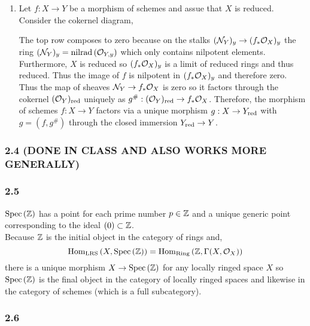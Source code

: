 \documentclass[12pt]{article}
\begin{document}
\begin{enumerate}
\item Let $f : X \to Y$ be a morphism of schemes and assue that $X$ is reduced. Consider the cokernel diagram,
\begin{center}
\end{center}
The top row composes to zero because on the stalks $(\mathcal{N}_Y)_y \to (f_* \mathcal{O}_{X})_y$ the ring $(\mathcal{N}_Y)_y = \mathrm{nilrad}\left( \mathcal{O}_{Y, y} \right)$ which only contains nilpotent elements. Furthermore, $X$ is reduced so $(f_* \mathcal{O}_{X})_y$ is a limit of reduced rings and thus reduced. Thus the image of $f$ is nilpotent in $(f_* \mathcal{O}_{X})_y$ and therefore zero. Thus the map of sheaves $\mathcal{N}_Y \to f_* \mathcal{O}_{X}$ is zero so it factors through the cokernel $(\mathcal{O}_{Y})_{\mathrm{red}}$ uniquely as $g^\# : (\mathcal{O}_{Y})_{\mathrm{red}} \to f_* \mathcal{O}_{X}$. Therefore, the morphism of schemes $f : X \to Y$ factors via a unique morphism $g : X \to Y_{\mathrm{red}}$ with $g = (f, g^\#)$ through the closed immersion $Y_{\mathrm{red}} \to Y$.
\end{enumerate}

\subsubsection{2.4 (DONE IN CLASS AND ALSO WORKS MORE GENERALLY)}

\subsubsection{2.5}

$\mathrm{Spec}\left( \mathbb{Z} \right)$ has a point for each prime number $p \in \mathbb{Z}$ and a unique generic point corresponding to the ideal $(0) \subset \mathbb{Z}$.
\bigskip\\
Because $\mathbb{Z}$ is the initial object in the category of rings and,
\[ \mathrm{Hom}_{\mathrm{LRS}} \left( X, \mathrm{Spec}\left( \mathbb{Z} \right) \right) = \mathrm{Hom}_{\mathrm{Ring}} \left( \mathbb{Z}, \Gamma(X, \mathcal{O}_{X}) \right) \]
there is a unique morphism $X \to \mathrm{Spec}\left( \mathbb{Z} \right)$ for any locally ringed space $X$ so $\mathrm{Spec}\left( \mathbb{Z} \right)$ is the final object in the category of locally ringed spaces and likewise in the category of schemes (which is a full subcategory).

\subsubsection{2.6}
\end{document}
